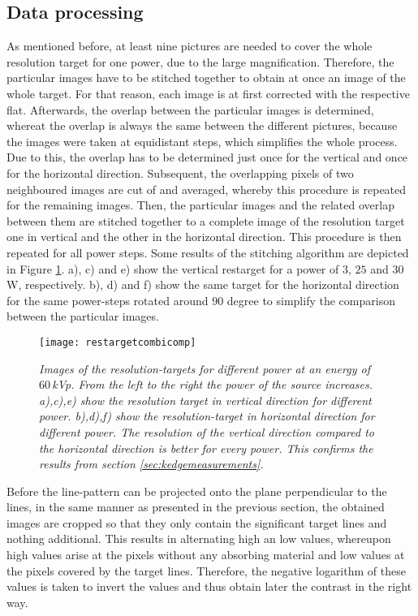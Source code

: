 \subsection{Data processing}\label{subsec:targetprocessing}
As mentioned before, at least nine pictures are needed to cover the whole resolution target for one power, due to the large magnification. Therefore, the particular images have to be stitched together to obtain at once an image of the whole target. For that reason, each image is at first corrected with the respective \gls{flat}. Afterwards, the overlap between the particular images is determined, whereat the overlap is always the same between the different pictures, because the images were taken at equidistant steps, which simplifies the whole process. Due to this, the overlap has to be determined just once for the vertical and once for the horizontal direction. Subsequent, the overlapping pixels of two neighboured images are cut of and averaged, whereby this procedure is repeated for the remaining images. Then, the particular images and the related overlap between them are stitched together to a complete image of the resolution target one in vertical and the other in the horizontal direction. This procedure is then repeated for all power steps. Some results of the stitching algorithm are depicted in Figure \ref{restargetcombi}. a), c) and e) show the vertical \gls{restarget} for a power of $3$, $25$ and $30\,$W, respectively. b), d) and f) show the same target for the horizontal direction for the same power-steps rotated around $90$ degree to simplify the comparison between the particular images.
\begin{figure}[h]
	\begin{center}
		\texttt{[image: restargetcombicomp]}
	\end{center}
	\caption[Images of resolution-targets for different power]{\textit{Images of the resolution-targets for different power at an energy of $60\,$kVp. From the left to the right the power of the source increases. a),c),e) show the resolution target in vertical direction for different power. b),d),f) show the resolution-target in horizontal direction for different power. The resolution of the vertical direction compared to the horizontal direction is better for every power. This confirms the results from section \ref{sec:kedgemeasurements}.}}
	\label{restargetcombi}
\end{figure}
Before the line-pattern can be projected onto the plane perpendicular to the lines, in the same manner as presented in the previous section, the obtained images are cropped so that they only contain the significant target lines and nothing additional. This results in alternating high an low values, whereupon high values arise at the pixels without any absorbing material and low values at the pixels covered by the target lines. Therefore, the negative logarithm of these values is taken to invert the values and thus obtain later the contrast in the right way.\\ 

